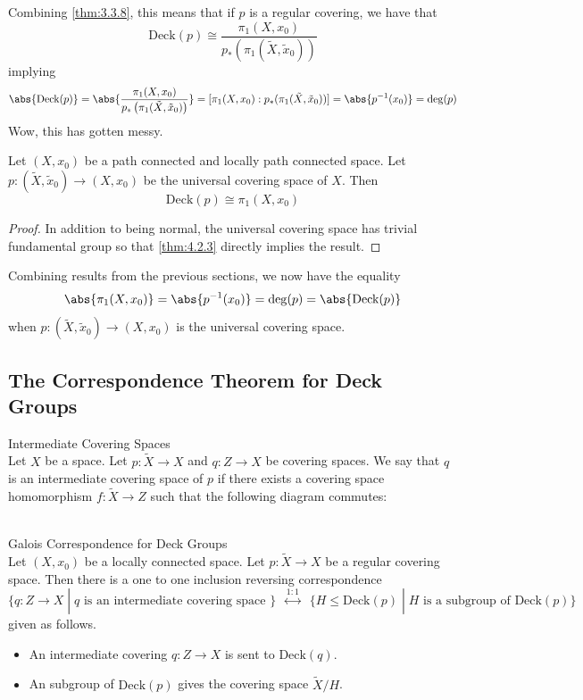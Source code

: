\documentclass[a4paper]{article}
\begin{document}
Combining \ref{thm:3.3.8}, this means that if $p$ is a regular covering, we have that $$\text{Deck}(p)\cong\frac{\pi_1(X,x_0)}{p_\ast\left(\pi_1(\tilde{X},\tilde{x}_0)\right)}$$ implying $$\abs{\text{Deck}(p)}=\abs{\frac{\pi_1(X,x_0)}{p_\ast\left(\pi_1(\tilde{X},\tilde{x}_0)\right)}}=[\pi_1(X,x_0):p_\ast(\pi_1(\tilde{X},\tilde{x}_0))]=\abs{p^{-1}(x_0)}=\deg(p)$$ Wow, this has gotten messy. 

\begin{crl}{}{} Let $(X,x_0)$ be a path connected and locally path connected space. Let $p:(\tilde{X},\tilde{x}_0)\to(X,x_0)$ be the universal covering space of $X$. Then $$\text{Deck}(p)\cong\pi_1(X,x_0)$$ 
\begin{proof}
In addition to being normal, the universal covering space has trivial fundamental group so that \ref{thm:4.2.3} directly implies the result. 
\end{proof}
\end{crl}

Combining results from the previous sections, we now have the equality $$\abs{\pi_1(X,x_0)}=\abs{p^{-1}(x_0)}=\deg(p)=\abs{\text{Deck}(p)}$$ when $p:(\tilde{X},\tilde{x}_0)\to(X,x_0)$ is the universal covering space. 

\subsection{The Correspondence Theorem for Deck Groups}
\begin{defn}{Intermediate Covering Spaces}{}\\
Let $X$ be a space. Let $p:\widetilde{X}\to X$ and $q:Z\to X$ be covering spaces. We say that $q$ is an intermediate covering space of $p$ if there exists a covering space homomorphism $f:\widetilde{X}\to Z$ such that the following diagram commutes: \\
\\
\end{defn}

\begin{thm}{Galois Correspondence for Deck Groups}{}\\
Let $(X,x_0)$ be a locally connected space. Let $p:\widetilde{X}\to X$ be a regular covering space. Then there is a one to one inclusion reversing correspondence $$\{q:Z\to X\;|\;q\text{ is an intermediate covering space }\}\;\;\overset{1:1}{\longleftrightarrow}\;\;\{H\leq\text{Deck}(p)\;|\;H\text{ is a subgroup of Deck}(p)\}$$ given as follows. 
\begin{itemize}
\item An intermediate covering $q:Z\to X$ is sent to $\text{Deck}(q)$. 
\item An subgroup of $\text{Deck}(p)$ gives the covering space $\widetilde{X}/H$. 
\end{itemize}
\end{thm}
\end{document}
